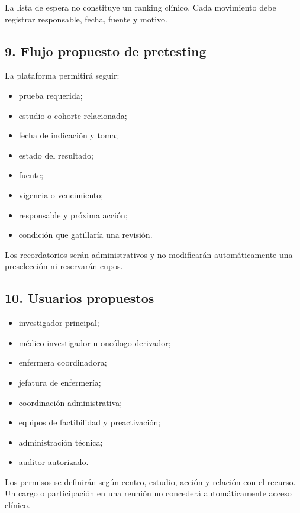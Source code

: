 \documentclass[
]{article}
\providecommand{\tightlist}{%
  \setlength{\itemsep}{0pt}\setlength{\parskip}{0pt}}
\begin{document}
La lista de espera no constituye un ranking clínico. Cada movimiento
debe registrar responsable, fecha, fuente y motivo.

\hypertarget{9-flujo-propuesto-de-pretesting}{%
\subsection{9. Flujo propuesto de
pretesting}\label{9-flujo-propuesto-de-pretesting}}

La plataforma permitirá seguir:

\begin{itemize}
\tightlist
\item
  prueba requerida;
\item
  estudio o cohorte relacionada;
\item
  fecha de indicación y toma;
\item
  estado del resultado;
\item
  fuente;
\item
  vigencia o vencimiento;
\item
  responsable y próxima acción;
\item
  condición que gatillaría una revisión.
\end{itemize}

Los recordatorios serán administrativos y no modificarán automáticamente
una preselección ni reservarán cupos.

\hypertarget{10-usuarios-propuestos}{%
\subsection{10. Usuarios propuestos}\label{10-usuarios-propuestos}}

\begin{itemize}
\tightlist
\item
  investigador principal;
\item
  médico investigador u oncólogo derivador;
\item
  enfermera coordinadora;
\item
  jefatura de enfermería;
\item
  coordinación administrativa;
\item
  equipos de factibilidad y preactivación;
\item
  administración técnica;
\item
  auditor autorizado.
\end{itemize}

Los permisos se definirán según centro, estudio, acción y relación con
el recurso. Un cargo o participación en una reunión no concederá
automáticamente acceso clínico.
\end{document}
